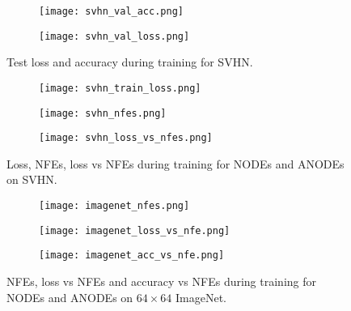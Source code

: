 \documentclass{article}
\begin{document}
\begin{figure}[t]
\centering
\begin{subfigure}[t]{0.45\linewidth}
\centering
\texttt{[image: svhn\_val\_acc.png]}
\end{subfigure}
\begin{subfigure}[t]{0.45\linewidth}
\centering
\texttt{[image: svhn\_val\_loss.png]}
\end{subfigure}
\caption{Test loss and accuracy during training for SVHN.}
\label{svhn-test-acc-loss}
\end{figure}

\begin{figure}[t]
\centering
\begin{subfigure}[t]{0.32\linewidth}
\centering
\texttt{[image: svhn\_train\_loss.png]}
\end{subfigure}
\begin{subfigure}[t]{0.32\linewidth}
\centering
\texttt{[image: svhn\_nfes.png]}
\end{subfigure}
\begin{subfigure}[t]{0.32\linewidth}
\centering
\texttt{[image: svhn\_loss\_vs\_nfes.png]}
\end{subfigure}
\caption{Loss, NFEs, loss vs NFEs during training for NODEs and ANODEs on SVHN.}
\label{svhn-training-results}
\end{figure}

\begin{figure}[t]
\centering
\begin{subfigure}[t]{0.32\linewidth}
\centering
\texttt{[image: imagenet\_nfes.png]}
\end{subfigure}
\begin{subfigure}[t]{0.32\linewidth}
\centering
\texttt{[image: imagenet\_loss\_vs\_nfe.png]}
\end{subfigure}
\begin{subfigure}[t]{0.32\linewidth}
\centering
\texttt{[image: imagenet\_acc\_vs\_nfe.png]}
\end{subfigure}
\caption{NFEs, loss vs NFEs and accuracy vs NFEs during training for NODEs and ANODEs on $64\times 64$ ImageNet.}
\label{imagenet-training-results}
\end{figure}
\end{document}
